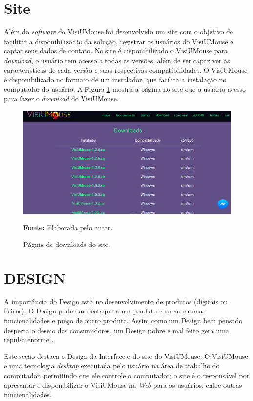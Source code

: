 \section{Site}\label{sub:visiumouse-objtivo-site}
Além do \textit{software} do VisiUMouse foi desenvolvido um site com o objetivo de facilitar a disponibilização da solução, registrar os usuários do VisiUMouse e captar seus dados de contato. 
No site é disponibilizado o VisiUMouse para \textit{download}, o usuário tem acesso a todas as versões, além de ser capaz ver as características de cada versão e suas respectivas compatibilidades. O VisiUMouse é disponibilizado no formato de um instalador, que facilita a instalação no computador do usuário. A Figura \ref{fig:site-download} mostra a página no site que o usuário acesso para fazer o \textit{download} do VisiUMouse.


\begin{figure}[H]
\caption{Página de downloads do site.} 
\centering \includegraphics[scale=0.35]{img/site-download.png}

{\fontsize{11}{11}\selectfont \textbf{Fonte:} Elaborada pelo autor.}
\label{fig:site-download}
\end{figure}



\section{DESIGN}\label{CAP6}

A importância do Design está no desenvolvimento de produtos (digitais ou físicos). O Design pode dar destaque a um produto com as mesmas funcionalidades e preço de outro produto. Assim como um Design bem pensado desperta o desejo dos consumidores, um Design pobre e mal feito gera uma repulsa enorme \cite{patterson2017computer}.

Este seção destaca o Design da Interface e do site do VisiUMouse. O VisiUMouse é uma tecnologia \textit{desktop} executada pelo usuário na área de trabalho do computador, permitindo que ele controle o computador; o site é o responsável por apresentar e disponibilizar o VisiUMouse na \textit{Web} para os usuários, entre outras funcionalidades.

